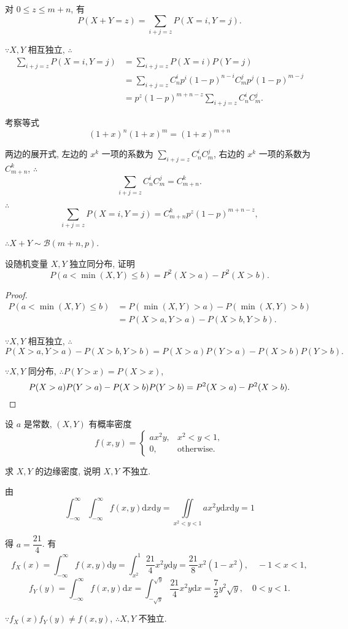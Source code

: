 \documentclass{ctexart}
\begin{document}
\begin{solution}
    对 $0\leq z\leq m+n$, 有
    \[P(X+Y=z)=\sum\limits_{i+j=z}P(X=i,Y=j).\]
    
    $\because X,Y$ 相互独立, $\therefore$
    \begin{align*}
        \sum\limits_{i+j=z}P(X=i,Y=j) & =\sum\limits_{i+j=z}P(X=i)P(Y=j) \\
        & =\sum\limits_{i+j=z}C_n^ip^i(1-p)^{n-i}C_m^jp^j(1-p)^{m-j} \\
        & =p^z(1-p)^{m+n-z}\sum\limits_{i+j=z}C_n^iC_m^j.
    \end{align*}

    考察等式
    \[(1+x)^n(1+x)^m=(1+x)^{m+n}\]

    两边的展开式, 左边的 $x^k$ 一项的系数为 $\sum\limits_{i+j=z}C_n^iC_m^j$, 右边的 $x^k$ 一项的系数为 $C_{m+n}^k$, $\therefore$
    \[\sum\limits_{i+j=z}C_n^iC_m^j=C_{m+n}^k.\]

    $\therefore$
    \[\sum\limits_{i+j=z}P(X=i,Y=j)=C_{m+n}^kp^z(1-p)^{m+n-z},\]

    $\therefore X+Y\sim\mathcal{B}(m+n,p)$.
\end{solution}
\addtocounter{exercise}{2}
\begin{exercise}%
    设随机变量 $X,Y$ 独立同分布, 证明
    \[P(a<\min(X,Y)\leq b)=P^2(X>a)-P^2(X>b).\]
\end{exercise}
\begin{proof}
    \begin{align*}
        P(a<\min(X,Y)\leq b) & =P(\min(X,Y)>a)-P(\min(X,Y)>b) \\
        & =P(X>a,Y>a)-P(X>b,Y>b).
    \end{align*}

    $\because X,Y$ 相互独立, $\therefore$
    \[P(X>a,Y>a)-P(X>b,Y>b)=P(X>a)P(Y>a)-P(X>b)P(Y>b).\]

    $\because X,Y$ 同分布, $\therefore P(Y>x)=P(X>x)$,
    \[P(X>a)P(Y>a)-P(X>b)P(Y>b)=P^2(X>a)-P^2(X>b).\qedhere\]
\end{proof}
\begin{exercise}%
    设 $a$ 是常数, $(X,Y)$ 有概率密度
    \[f(x,y)=\begin{cases}
        ax^2y, & x^2<y<1, \\
        0, & \text{otherwise}.
    \end{cases}\]

    求 $X,Y$ 的边缘密度, 说明 $X,Y$ 不独立.
\end{exercise}
\begin{solution}
    由
    \[\int_{-\infty}^\infty\int_{-\infty}^\infty f(x,y)\mathrm{d}x\mathrm{d}y=\iint\limits_{x^2<y<1}ax^2y\mathrm{d}x\mathrm{d}y=1\]

    得 $a=\dfrac{21}{4}$. 有
    \[f_X(x)=\int_{-\infty}^\infty f(x,y)\mathrm{d}y=\int_{x^2}^1\dfrac{21}{4}x^2y\mathrm{d}y=\dfrac{21}{8}x^2(1-x^2),\quad -1<x<1,\]
    \[f_Y(y)=\int_{-\infty}^\infty f(x,y)\mathrm{d}x=\int_{-\sqrt{y}}^{\sqrt{y}}\dfrac{21}{4}x^2y\mathrm{d}x=\dfrac{7}{2}y^2\sqrt{y},\quad 0<y<1.\]

    $\because f_X(x)f_Y(y)\neq f(x,y)$, $\therefore X,Y$ 不独立.
\end{solution}
\end{document}
